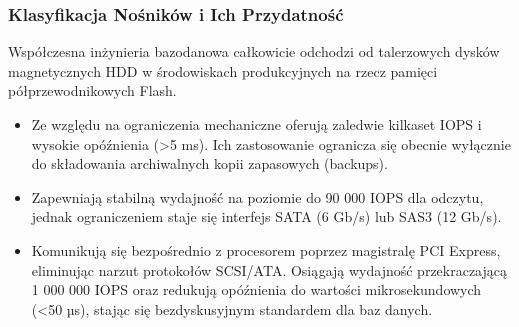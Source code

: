 \documentclass[letterpaper,10pt,polish]{sphinxmanual}
\begin{document}
\subsubsection{Klasyfikacja Nośników i Ich Przydatność}
\label{\detokenize{rozdzia_u0142_2/rozdzia_u0142_21/index:klasyfikacja-nosnikow-i-ich-przydatnosc}}
\sphinxAtStartPar
Współczesna inżynieria bazodanowa całkowicie odchodzi od talerzowych dysków magnetycznych HDD w środowiskach produkcyjnych na rzecz pamięci półprzewodnikowych Flash.
\begin{itemize}
\item {} 
\sphinxAtStartPar
{} Ze względu na ograniczenia mechaniczne oferują zaledwie kilkaset IOPS i wysokie opóźnienia (\textgreater{}5 ms). Ich zastosowanie ogranicza się obecnie wyłącznie do składowania archiwalnych kopii zapasowych (backups).

\item {} 
\sphinxAtStartPar
{} Zapewniają stabilną wydajność na poziomie do 90 000 IOPS dla odczytu, jednak ograniczeniem staje się interfejs SATA (6 Gb/s) lub SAS\sphinxhyphen{}3 (12 Gb/s).

\item {} 
\sphinxAtStartPar
{} Komunikują się bezpośrednio z procesorem poprzez magistralę PCI Express, eliminując narzut protokołów SCSI/ATA. Osiągają wydajność przekraczającą 1 000 000 IOPS oraz redukują opóźnienia do wartości mikrosekundowych (\textless{}50 µs), stając się bezdyskusyjnym standardem dla baz danych.

\end{itemize}
\end{document}
